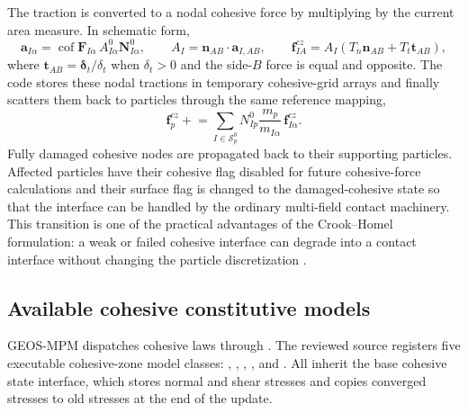The traction is converted to a nodal cohesive force by multiplying by the current area measure.  In schematic form,
\begin{equation}
  \mathbf{a}_{I\alpha}
  = \operatorname{cof}\mathbf{F}_{I\alpha}\,A^0_{I\alpha}\mathbf{N}^0_{I\alpha},
  \qquad
  A_I = \mathbf{n}_{AB}\cdot\mathbf{a}_{I,AB},
  \qquad
  \mathbf{f}^{cz}_{IA}=A_I\left(T_n\mathbf{n}_{AB}+T_t\mathbf{t}_{AB}\right),
  \label{eq:cz-traction-force}
\end{equation}
where $\mathbf{t}_{AB}=\boldsymbol{\delta}_t/\delta_t$ when $\delta_t>0$ and the side-$B$ force is equal and opposite.  The code stores these nodal tractions in temporary cohesive-grid arrays and finally scatters them back to particles through the same reference mapping,
\begin{equation}
  \mathbf{f}^{cz}_p \mathrel{+}= \sum_{I\in\mathcal{S}_p^0}
      N^0_{Ip}\frac{m_p}{m_{I\alpha}}\,\mathbf{f}^{cz}_{I\alpha}.
  \label{eq:cz-grid-to-particle}
\end{equation}
Fully damaged cohesive nodes are propagated back to their supporting particles.  Affected particles have their cohesive flag disabled for future cohesive-force calculations and their surface flag is changed to the damaged-cohesive state so that the interface can be handled by the ordinary multi-field contact machinery.  This transition is one of the practical advantages of the Crook--Homel formulation: a weak or failed cohesive interface can degrade into a contact interface without changing the particle discretization \cite{crook2025cohesive}.

\subsection{Available cohesive constitutive models}

GEOS-MPM dispatches cohesive laws through .  The reviewed source registers five executable cohesive-zone model classes: , , , , and .  All inherit the base cohesive state interface, which stores normal and shear stresses and copies converged stresses to old stresses at the end of the update.

